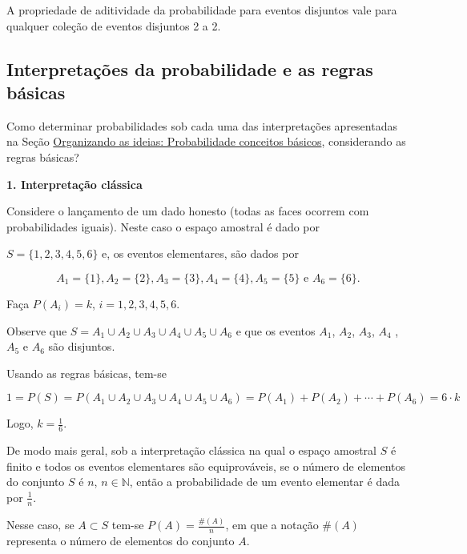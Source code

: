 A propriedade de aditividade da probabilidade para eventos disjuntos vale para qualquer coleção de eventos disjuntos 2 a 2.


\subsection{Interpretações da probabilidade e as regras básicas}

Como determinar probabilidades sob cada uma das interpretações apresentadas na Seção \hyperref[organizandoconceitosbasicos]{Organizando as ideias: Probabilidade \textendash{} conceitos básicos}, considerando as regras básicas?

\textbf{1. Interpretação clássica}

\begin{example}{}

Considere o lançamento de um dado honesto (todas as faces ocorrem com probabilidades iguais). Neste caso o espaço amostral é dado por

\(S=\{ 1,2,3,4,5,6\}\) e, os eventos elementares, são dados por

$$A_1=\{1\}, A_2=\{2\}, A_3=\{3\}, A_4=\{4\}, A_5=\{5\} \text{ e } A_6=\{6\}.$$

Faça \(P(A_i)=k\), \(i=1,2,3,4,5,6\).

Observe que \(S=A_1\cup A_2\cup A_3\cup A_4\cup A_5 \cup A_6\) e que os eventos \(A_1\), \(A_2\), \(A_3\), \(A_4\) , \(A_5\) e \(A_6\) são disjuntos.

Usando as regras básicas, tem-se

$$1=P(S)=P(A_1\cup A_2\cup A_3\cup A_4\cup A_5 \cup A_6)=P(A_1)+P(A_2)+\cdots +P(A_6)=6\cdot k$$

Logo, \(k=\frac{1}{6}\).
\end{example}

De modo mais geral, sob a interpretação clássica na qual o espaço amostral \(S\) é finito e todos os eventos elementares são equiprováveis, se o número de elementos do conjunto \(S\) é \(n\), \(n\in \mathbb{N}\), então a probabilidade de um evento elementar é dada por \(\frac{1}{n}\).

Nesse caso, se \(A\subset S\) tem-se $\displaystyle{P(A)=\frac{\#(A)}{n}}$, em que a notação \(\#(A)\) representa o número de elementos do conjunto \(A\).

